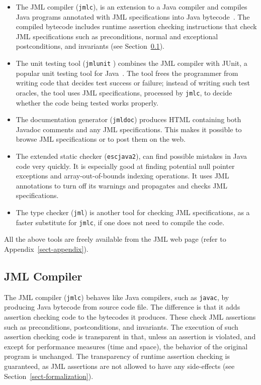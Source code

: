 \documentclass[twocolumn]{article}
\begin{document}
\begin{itemize}
\item The JML compiler (\texttt{jmlc}),
is an extension to a Java compiler
and compiles Java programs annotated with JML specifications into Java
bytecode~\cite{Cheon-Leavens02b,Cheon03}.
The compiled bytecode includes
runtime assertion checking instructions that check JML specifications
such as preconditions, normal and exceptional postconditions, and
invariants (see Section~\ref{sect-jml-compiler}).

\item The unit testing tool (\texttt{jmlunit} \cite{Cheon-Leavens02})
combines the JML compiler with JUnit, a popular unit testing tool for
Java~\cite{Beck-Gamma98}. The tool frees the programmer from writing
code that decides test success or failure; instead of writing such
test oracles, the tool uses JML specifications, processed by \texttt{jmlc},
to decide whether the code being tested works properly.

\item The documentation generator (\texttt{jmldoc})
produces HTML containing both Javadoc comments and any JML
specifications.  This makes it possible to browse JML specifications
or to post them on the web.

\item The extended static checker (\texttt{escjava2}),
can find possible mistakes in Java code very quickly.  It is
especially good at finding potential null pointer exceptions and 
array-out-of-bounds indexing operations.  It uses JML annotations to turn off
its warnings and propagates and checks JML specifications.

\item The type checker (\texttt{jml})
is another tool for checking JML specifications, as a faster substitute for
\texttt{jmlc}, if one does not need to compile the code.
\end{itemize}

All the above tools are freely available from the JML web page (refer
to Appendix~\ref{sect-appendix}). 

\subsection{JML Compiler}
\label{sect-jml-compiler}

The JML compiler (\texttt{jmlc}) behaves like Java compilers, such as
\texttt{javac}, by producing Java bytecode from source code file.  The
difference is that it adds assertion checking code to the bytecodes it
produces.  These check JML assertions such as preconditions,
postconditions, and invariants.
The execution of such assertion checking code is
transparent in that, unless an assertion is violated, and except for
performance measures (time and space), the behavior of the original
program is unchanged.  The transparency of runtime assertion checking
is guaranteed, as JML assertions are not allowed to have any
side-effects (see Section~\ref{sect-formalization}).
\end{document}
